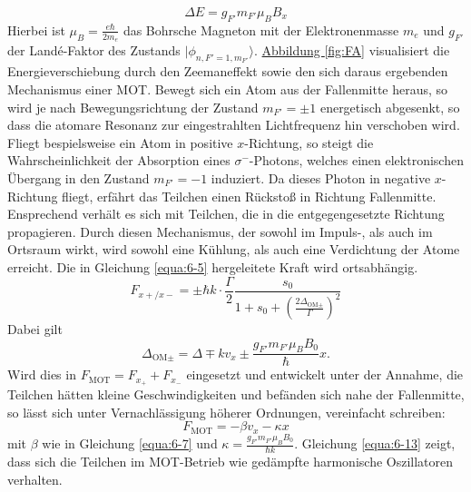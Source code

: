 \documentclass[
class=book,
accentcolor=1b,
custommargins=geometry,
fontsize=11pt,
thesis={type=Versuchsanleitung},
ruledheaders=all,
headline=false,
instbox=false,
marginpar=false,
title=small,
ignore-missing-data=true,
twoside=false,
logofile=apqdesign/tuda_logo.pdf,
pdfa=false %
]{apqpub}
\begin{document}
				\begin{equation}
				\Delta E = g_{F'} m_{F'} \mu_B B_x
				\end{equation}				
				Hierbei ist $\mu_B = \frac{e \hbar}{2 m_e}$ das Bohrsche Magneton mit der Elektronenmasse $m_e$ und $g_{F'}$ der Landé-Faktor des Zustands $\lvert \phi_{n,F'=1,m_{F'}}\rangle$. 
				\hyperref[fig:FA]{Abbildung \ref{fig:FA}} visualisiert die Energieverschiebung durch den Zeemaneffekt sowie den sich daraus ergebenden Mechanismus einer MOT. 
				Bewegt sich ein Atom aus der Fallenmitte heraus, so wird je nach Bewegungsrichtung der Zustand $m_{F'} = \pm 1$ energetisch abgesenkt, so dass die atomare Resonanz zur eingestrahlten Lichtfrequenz hin verschoben wird. 
				Fliegt bespielsweise ein Atom in positive $x$-Richtung, so steigt die Wahrscheinlichkeit der Absorption eines $\sigma^-$-Photons, welches einen elektronischen Übergang in den Zustand $m_{F'} = -1$ induziert. 
				Da dieses Photon in negative $x$-Richtung fliegt, erfährt das Teilchen einen Rückstoß in Richtung	Fallenmitte. 
				Ensprechend verhält es sich mit Teilchen, die in die entgegengesetzte Richtung propagieren.
				Durch diesen Mechanismus, der sowohl im Impuls-, als auch im Ortsraum wirkt, wird sowohl eine Kühlung, als auch eine Verdichtung der Atome erreicht.
				Die in Gleichung \eqref{equa:6-5} hergeleitete Kraft wird ortsabhängig.			
				\begin{equation}\label{equa:6-11}
				F_{x+/ x-} = \pm \hbar k \cdot \frac{\Gamma}{2} \frac{s_0}{1+s_0+\left(\frac{2\Delta_{\text{OM}\pm}}{\Gamma}\right)^2} 
				\end{equation}				
				Dabei gilt		
				\begin{equation}
				\Delta_{\text{OM}\pm} = \Delta \mp k v_{x} \pm \frac{g_{F'} m_{F'} \mu_B B_0}{\hbar}x.
				\end{equation}				
				Wird dies in $F_{\text{MOT}} = F_{x_+} + F_{x_-}$ eingesetzt und entwickelt unter der Annahme, die Teilchen hätten kleine Geschwindigkeiten und befänden sich nahe der Fallenmitte, so lässt sich unter Vernachlässigung höherer Ordnungen, vereinfacht schreiben:			
				\begin{equation}\label{equa:6-13}
				F_{\text{MOT}} = -\beta v_x  -\kappa x
				\end{equation}				
				mit $\beta$ wie in Gleichung \eqref{equa:6-7} und $\kappa = \frac{g_{F'} m_{F'} \mu_B B_0}{\hbar k}$. Gleichung \eqref{equa:6-13} zeigt, dass sich die Teilchen im MOT-Betrieb wie gedämpfte harmonische Oszillatoren verhalten.\\
				
\end{document}
